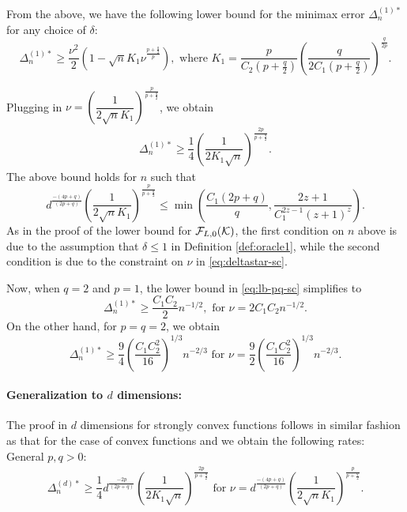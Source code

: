 From the above, we have the following lower bound for the minimax error $\Delta_n^{(1)*}$ for any choice of $\delta$:
\[
\Delta_n^{(1)*} \ge \dfrac{\nu^2}{2} \left(1 - \sqrt{n}  K_1 \nu^{\frac{p+\tfrac{q}{2}}{p}}\right), \text{ where } K_1 = \dfrac{p}{C_2(p+\tfrac{q}{2})} \left(\dfrac{q}{2C_1(p+\tfrac{q}{2})}\right)^{\frac{q}{2p}}.
\]


Plugging in $\nu = \left(\dfrac{1}{2\sqrt{n} K_1} \right)^{\frac{p}{p+\frac{q}{2}}}$, we obtain
\begin{align}
\Delta_n^{(1)*} \ge \dfrac{1}{4}\left(\dfrac{1}{2 K_1 \sqrt n}\right)^{\frac{2p}{p+\frac{q}{2}}}.
\label{eq:lb-pq-sc}
\end{align}
The above bound holds for $n$ such that 
$$\!d^{\frac{-(4p+q)}{(2p+q)}}\!\!\left(\frac{1}{2\sqrt{n} K_1} \right)^{\!\!\frac{p}{p+\frac{q}{2}}} \!\!\!\le \!\!\min\!\left( \frac{C_1 (2p+q)}{q}, \frac{2z+1}{C_1^{2z-1}(z+1)^z}\!\right).$$
As in the proof of the lower bound for $\mathcal{F}_{L,0}(\mathcal{K})$, the first condition on $n$ above is due to the assumption that $\delta \le 1$ in Definition \ref{def:oracle1}, while the second condition is due to the constraint on $\nu$ in \eqref{eq:deltastar-sc}.

Now, when $q=2$ and $p=1$, the lower bound in \eqref{eq:lb-pq-sc} simplifies to
\[
\Delta_n^{(1)*} \ge \dfrac{C_1 C_2}{2} n^{-1/2}, \text{ for } \nu = 2C_1C_2 n^{-1/2}.
\]
On the other hand, for $p=q=2$, we obtain
\[
\Delta_n^{(1)*} \ge  \frac{9}{4}\left(\frac{C_1 C_2^2}{16}\right)^{1/3} n^{-2/3} \text{ for } \nu=\frac{9}{2}\left(\frac{C_1 C_2^2}{16}\right)^{1/3}n^{-2/3}.
\]



\paragraph{Generalization to $d$ dimensions:}
The proof in $d$ dimensions for strongly convex functions follows in similar fashion as that for the case of convex functions and we obtain the following rates:\\
General $p, q >0$:
\begin{align}
\Delta_n^{(d)*} \ge \dfrac{1}{4} d^{\frac{-2p}{(2p+q)}} \left(\dfrac{1}{2 K_1 \sqrt n}\right)^{\frac{2p}{p+\frac{q}{2}}} \text{ for } 
\nu = d^{\frac{-(4p+q)}{(2p+q)}}\left(\dfrac{1}{2\sqrt{n} K_1} \right)^{\frac{p}{p+\frac{q}{2}}}.
\label{eq:lb-pq-d}
\end{align}

